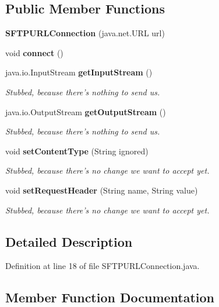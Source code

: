 \subsection*{Public Member Functions}
\begin{DoxyCompactItemize}
\item 
{\bfseries S\-F\-T\-P\-U\-R\-L\-Connection} (java.\-net.\-U\-R\-L url)\label{classorg_1_1smallfoot_1_1filexfer_1_1sftp_1_1SFTPURLConnection_a31333738e73c420407fe864e744eb5e3}

\item 
void {\bfseries connect} ()\label{classorg_1_1smallfoot_1_1filexfer_1_1sftp_1_1SFTPURLConnection_a1396bf9b5defe9fa844a63b5cd40ac0e}

\item 
java.\-io.\-Input\-Stream {\bf get\-Input\-Stream} ()
\begin{DoxyCompactList}\small\item\em Stubbed, because there's nothing to send us. \end{DoxyCompactList}\item 
java.\-io.\-Output\-Stream {\bf get\-Output\-Stream} ()
\begin{DoxyCompactList}\small\item\em Stubbed, because there's nothing to send us. \end{DoxyCompactList}\item 
void {\bf set\-Content\-Type} (String ignored)
\begin{DoxyCompactList}\small\item\em Stubbed, because there's no change we want to accept yet. \end{DoxyCompactList}\item 
void {\bf set\-Request\-Header} (String name, String value)
\begin{DoxyCompactList}\small\item\em Stubbed, because there's no change we want to accept yet. \end{DoxyCompactList}\end{DoxyCompactItemize}


\subsection{Detailed Description}


Definition at line 18 of file S\-F\-T\-P\-U\-R\-L\-Connection.\-java.



\subsection{Member Function Documentation}
